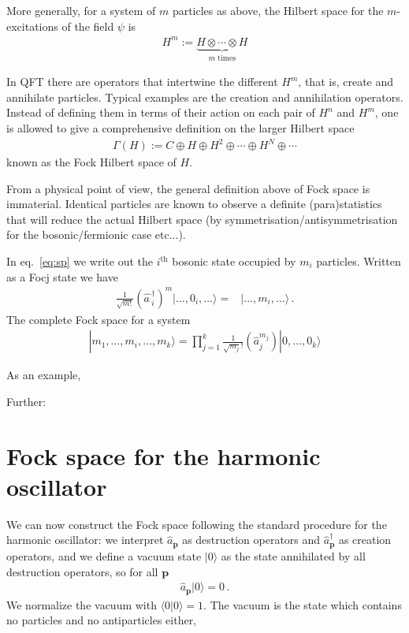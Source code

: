 \begin{frame}
More generally, for a system of $m$ particles as above, the Hilbert space for the $m$-excitations of the field $\psi$ is
\begin{align}
  H^m := \underbrace{H\otimes\cdots\otimes H}_{m\text{ times}}
\end{align}

In QFT there are operators that intertwine the different $H^m$, that is, create and annihilate particles. Typical examples are the creation and annihilation operators. Instead of defining them in terms of their action on each pair of $H^n$ and $H^m$, one is allowed to give a comprehensive definition on the larger Hilbert space
\begin{align}
  \Gamma(H):=C\oplus H\oplus H^2\oplus\cdots\oplus H^N\oplus\cdots
\end{align}
known as the Fock Hilbert space of $H$.

From a physical point of view, the general definition above of Fock space is immaterial. Identical particles are known to observe a definite (para)statistics that will reduce the actual Hilbert space (by symmetrisation/antisymmetrisation for the bosonic/fermionic case etc...).


In eq.~\eqref{eq:sp} we write out the $i^{\text{th}}$ bosonic state occupied by $m_{i}$ particles. Written as a Focj state we have
\begin{align}
\frac{1}{\sqrt{m!}} \left(\widehat{a\,}_{i}^\dagger\right)^m |\ldots,0_i,\ldots\rangle
=&|\ldots,m_i,\ldots\rangle\,.
\end{align}
The complete Fock space for a system
\begin{align}
  |m_1,\ldots,m_i,\ldots,m_k \rangle =\prod_{j=1}^k \frac{1}{\sqrt{m_j}!}\left( \hat{a}_j^{m_j} \right)
|0,\ldots,0_k \rangle
\end{align}


As an example,  

Further: %

\section{Fock space for the harmonic oscillator}
We can now construct the Fock space following the standard procedure
for the harmonic oscillator: we interpret $\widehat{a}_\mathbf{p}$ as destruction operators and $\widehat{a}_\mathbf{p}^\dagger$
as creation operators, and we define a vacuum state $|0\rangle$ as the state
annihilated by all destruction operators, so for all $\mathbf{p}$
\begin{align}
  \widehat{a}_\mathbf{p}|0\rangle=0\,.
\end{align}
We normalize the vacuum with $\langle0|0\rangle=1$. The vacuum is the state which contains no particles and no antiparticles either,


\end{frame}
